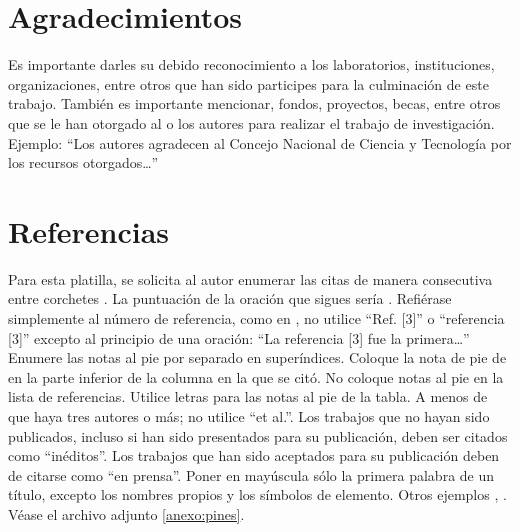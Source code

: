     \section{Agradecimientos}
    
    Es importante darles su debido reconocimiento a los laboratorios, instituciones, organizaciones, entre otros que han sido participes para la culminación de este trabajo. También es importante mencionar, fondos, proyectos, becas, entre otros que se le han otorgado al o los autores para realizar el trabajo de investigación. Ejemplo: “Los autores agradecen al Concejo Nacional de Ciencia y Tecnología por los recursos otorgados…”
    
    \section*{Referencias}
    
    Para esta platilla, se solicita al autor enumerar las citas de manera consecutiva entre corchetes \cite{YLi2013}. 
    La puntuación de la oración que sigues sería \cite{Mesaelides2011}. 
    Refiérase simplemente al número de referencia, como en \cite{Morales2012}, no utilice “Ref. [3]” o “referencia [3]” excepto al principio de una oración: “La referencia [3] fue la primera…”
    Enumere las notas al pie por separado en superíndices. Coloque la nota de pie de en la parte inferior de la columna en la que se citó. No coloque notas al pie en la lista de referencias. Utilice letras para las notas al pie de la tabla.
    A menos de que haya tres autores o más; no utilice “et al.”. Los trabajos que no hayan sido publicados, incluso si han sido presentados para su publicación, deben ser citados como “inéditos”. Los trabajos que han sido aceptados para su publicación deben de citarse como “en prensa”. Poner en mayúscula sólo la primera palabra de un título, excepto los nombres propios y los símbolos de elemento. 
    Otros ejemplos \cite{LAAngeles2021}, \cite{LAAngelesConni}. 
    Véase el archivo adjunto \ref{anexo:pines}.
    
    
